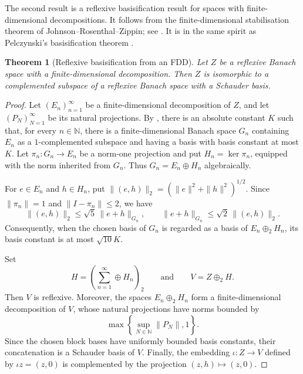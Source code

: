 \documentclass[11pt,reqno]{amsart}
\makeatletter
\theoremstyle{plain}
\newtheorem{theorem}{Theorem}[section]
\theoremstyle{definition}
\newcommand{\N}{\mathbb N}
\newcounter{problempaper}
\newenvironment{problempaperbody}{%
  \setcounter{subsection}{0}%
  \setcounter{subsubsection}{0}%
  \setcounter{paragraph}{0}%
  \renewcommand{\thesubsection}{\arabic{subsection}}%
  \renewcommand{\thesubsubsection}{\thesubsection.\arabic{subsubsection}}%
  \renewcommand{\theparagraph}{\thesubsubsection.\arabic{paragraph}}%
  \let\problem@outersection\section
  \let\problem@outersubsection\subsection
  \let\problem@outersubsubsection\subsubsection
  \let\problem@outerparagraph\paragraph
  \let\section\problem@papersection
  \let\subsection\problem@papersubsection
  \let\subsubsection\problem@papersubsubsection
}{%
  \let\section\problem@outersection
  \let\subsection\problem@outersubsection
  \let\subsubsection\problem@outersubsubsection
  \let\paragraph\problem@outerparagraph
}
\newcommand{\problem@target}[2]{%
  \hypertarget{problem-\theproblempaper-#1-#2}{}%
}
\newcommand{\problem@paperheading}[3]{%
  \par\bigskip
  \problem@target{#1}{#2}%
  \noindent{\large\bfseries #2.\quad #3\par}%
  \nobreak\smallskip
}
\newcommand{\problem@papersubheading}[3]{%
  \par\medskip
  \problem@target{#1}{#2}%
  \noindent{\normalsize\bfseries #2.\quad #3\par}%
  \nobreak\smallskip
}
\newcommand{\problem@papersubsubheading}[3]{%
  \par\smallskip
  \problem@target{#1}{#2}%
  \noindent{\normalsize\itshape #2.\quad #3.\ }%
}
\def\problem@papersection{%
  \@ifstar{\problem@papersectionstar}{\problem@papersectionnostar}%
}
\def\problem@papersectionstar#1{%
  \par\bigskip\noindent{\large\bfseries #1\par}\nobreak\smallskip
}
\def\problem@papersectionnostar#1{%
  \refstepcounter{subsection}%
  \setcounter{subsubsection}{0}%
  \setcounter{paragraph}{0}%
  \problem@paperheading{section}{\thesubsection}{#1}%
  \problem@writecontentsline{section}{\thesubsection}{#1}%
}
\def\problem@papersubsection{%
  \@ifstar{\problem@papersubsectionstar}{\problem@papersubsectionnostar}%
}
\def\problem@papersubsectionstar#1{%
  \par\medskip\noindent{\normalsize\bfseries #1\par}\nobreak\smallskip
}
\def\problem@papersubsectionnostar#1{%
  \refstepcounter{subsubsection}%
  \setcounter{paragraph}{0}%
  \problem@papersubheading{subsection}{\thesubsubsection}{#1}%
  \problem@writecontentsline{subsection}{\thesubsubsection}{#1}%
}
\def\problem@papersubsubsection{%
  \@ifstar{\problem@papersubsubsectionstar}{\problem@papersubsubsectionnostar}%
}
\def\problem@papersubsubsectionstar#1{%
  \par\smallskip\noindent{\normalsize\itshape #1.\ }%
}
\def\problem@papersubsubsectionnostar#1{%
  \refstepcounter{paragraph}%
  \problem@papersubsubheading{subsubsection}{\theparagraph}{#1}%
  \problem@writecontentsline{subsubsection}{\theparagraph}{#1}%
}
\newcommand{\problem@writecontentsline}[3]{%
  \begingroup
  \protected@write\@auxout{}{%
    \string\problemcontentsentry{\theproblempaper}{#1}{#2}{#3}{\thepage}%
  }%
  \endgroup
}
\newcommand{\problemcontentsentry}[5]{%
  \@ifundefined{problemcontents@#1}{%
    \expandafter\gdef\csname problemcontents@#1\endcsname{}%
  }{}%
  \expandafter\g@addto@macro\csname problemcontents@#1\endcsname{%
    \problemcontentsline{#1}{#2}{#3}{#4}{#5}%
  }%
}
\newcommand{\problemcontentslink}[4]{%
  \hyperlink{problem-#1-#2-#3}{#4}%
}
\newcommand{\problemcontentsline}[5]{%
  \ifstrequal{#2}{section}{%
    \par\noindent
    \problemcontentslink{#1}{#2}{#3}{\makebox[2.5em][l]{#3}#4}%
    \nobreak\dotfill
    \problemcontentslink{#1}{#2}{#3}{#5}\par
  }{%
    \ifstrequal{#2}{subsection}{%
      \par\noindent\hspace*{1.5em}%
      \problemcontentslink{#1}{#2}{#3}{\makebox[3.5em][l]{#3}#4}%
      \nobreak\dotfill
      \problemcontentslink{#1}{#2}{#3}{#5}\par
    }{%
      \par\noindent\hspace*{3em}%
      \problemcontentslink{#1}{#2}{#3}{\makebox[4.5em][l]{#3}#4}%
      \nobreak\dotfill
      \problemcontentslink{#1}{#2}{#3}{#5}\par
    }%
  }%
}
\makeatother
\begin{document}
\begin{problempaperbody}
The second result is a reflexive basisification result for spaces with finite-dimensional decompositions. It follows from the finite-dimensional stabilisation theorem of Johnson--Rosenthal--Zippin; see \cite[Corollary~4.12(a)]{JohnsonRosenthalZippin1971}. It is in the same spirit as Pelczynski's basisification theorem \cite{Pelczynski1971}.

\begin{theorem}[Reflexive basisification from an FDD]
\label{p5:thm:jrz-basisification}
Let $Z$ be a reflexive Banach space with a finite-dimensional decomposition. Then $Z$ is isomorphic to a complemented subspace of a reflexive Banach space with a Schauder basis.
\end{theorem}

\begin{proof}
Let $(E_n)_{n=1}^{\infty}$ be a finite-dimensional decomposition of $Z$, and let $(P_N)_{N=1}^{\infty}$ be its natural projections. By \cite[Corollary~4.12(a)]{JohnsonRosenthalZippin1971}, there is an absolute constant $K$ such that, for every $n\in\N$, there is a finite-dimensional Banach space $G_n$ containing $E_n$ as a $1$-complemented subspace and having a basis with basis constant at most $K$. Let $\pi_n\colon G_n\to E_n$ be a norm-one projection and put $H_n=\ker\pi_n$, equipped with the norm inherited from $G_n$. Thus $G_n=E_n\oplus H_n$ algebraically.

For $e\in E_n$ and $h\in H_n$, put $\|(e,h)\|_2=(\|e\|^2+\|h\|^2)^{1/2}$. Since $\|\pi_n\|=1$ and $\|I-\pi_n\|\leq2$, we have
\begin{equation*}
        \|(e,h)\|_2\leq\sqrt5\,\|e+h\|_{G_n},
        \qquad
        \|e+h\|_{G_n}\leq\sqrt2\,\|(e,h)\|_2.
\end{equation*}
Consequently, when the chosen basis of $G_n$ is regarded as a basis of $E_n\oplus_2H_n$, its basis constant is at most $\sqrt{10}K$.

Set
\begin{equation*}
        H=\left(\sum_{n=1}^{\infty}\oplus H_n\right)_2
        \qquad\text{and}\qquad
        V=Z\oplus_2H.
\end{equation*}
Then $V$ is reflexive. Moreover, the spaces $E_n\oplus_2H_n$ form a finite-dimensional decomposition of $V$, whose natural projections have norms bounded by
\begin{equation*}
        \max\left\{\sup_{N\in\N}\|P_N\|,1\right\}.
\end{equation*}
Since the chosen block bases have uniformly bounded basis constants, their concatenation is a Schauder basis of $V$. Finally, the embedding $\iota\colon Z\to V$ defined by $\iota z=(z,0)$ is complemented by the projection $(z,h)\mapsto(z,0)$.
\end{proof}


\end{problempaperbody}
\end{document}
